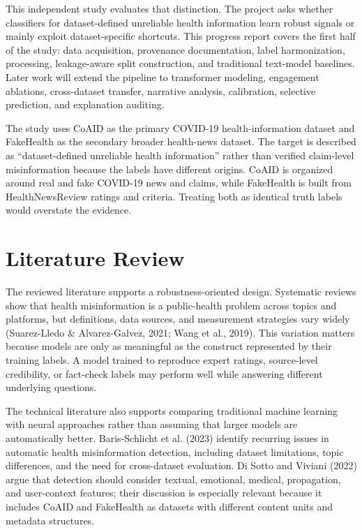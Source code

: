 \documentclass[12pt]{article}
\begin{document}
This independent study evaluates that distinction. The project asks whether classifiers for dataset-defined unreliable health information learn robust signals or mainly exploit dataset-specific shortcuts. This progress report covers the first half of the study: data acquisition, provenance documentation, label harmonization, processing, leakage-aware split construction, and traditional text-model baselines. Later work will extend the pipeline to transformer modeling, engagement ablations, cross-dataset transfer, narrative analysis, calibration, selective prediction, and explanation auditing.

The study uses CoAID as the primary COVID-19 health-information dataset and FakeHealth as the secondary broader health-news dataset. The target is described as ``dataset-defined unreliable health information'' rather than verified claim-level misinformation because the labels have different origins. CoAID is organized around real and fake COVID-19 news and claims, while FakeHealth is built from HealthNewsReview ratings and criteria. Treating both as identical truth labels would overstate the evidence.

\section*{Literature Review}

The reviewed literature supports a robustness-oriented design. Systematic reviews show that health misinformation is a public-health problem across topics and platforms, but definitions, data sources, and measurement strategies vary widely (Suarez-Lledo \& Alvarez-Galvez, 2021; Wang et al., 2019). This variation matters because models are only as meaningful as the construct represented by their training labels. A model trained to reproduce expert ratings, source-level credibility, or fact-check labels may perform well while answering different underlying questions.

The technical literature also supports comparing traditional machine learning with neural approaches rather than assuming that larger models are automatically better. Baris-Schlicht et al. (2023) identify recurring issues in automatic health misinformation detection, including dataset limitations, topic differences, and the need for cross-dataset evaluation. Di Sotto and Viviani (2022) argue that detection should consider textual, emotional, medical, propagation, and user-context features; their discussion is especially relevant because it includes CoAID and FakeHealth as datasets with different content units and metadata structures.
\end{document}
